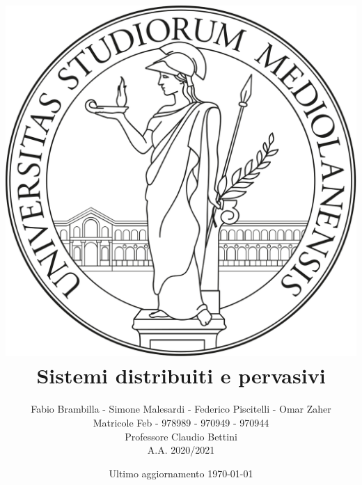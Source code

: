 \title{
    \vspace{0.5in}
    \includegraphics[scale=0.1]{images/logo.png}\\
    \textbf{Sistemi distribuiti e pervasivi}
}
\author{
    \vspace{0.1in}
    Fabio Brambilla - Simone Malesardi - Federico Piscitelli - Omar Zaher \\
    \vspace{0.1in}
    Matricole Feb - 978989 - 970949 - 970944 \\
    \vspace{0.1in}
    Professore Claudio Bettini \\
    \vspace{0.5in}
    A.A. 2020/2021 
}
\date{Ultimo aggiornamento \today}

\newcommand{\myparagraph}[1]{\paragraph{#1}\mbox{}\\}
\renewcommand\labelitemi{\tiny$\bullet$} %
\renewcommand{\contentsname}{Indice}

\hypersetup{
    colorlinks,
    citecolor=black,
    filecolor=black,
    linkcolor=black,
    urlcolor=black
}